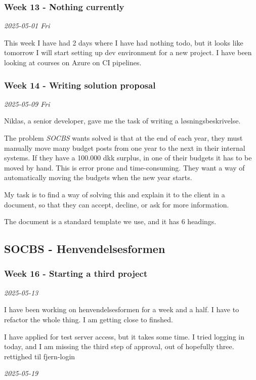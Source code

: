 \documentclass[../main.tex]{subfiles}
\begin{document}
\subsubsection{Week 13 - Nothing currently}
\noindent \textit{2025-05-01 Fri}
\smallskip

This week I have had 2 days where I have had nothing todo, but it looks like tomorrow I will start setting up dev environment for a new project. I have been looking at courses on Azure on CI pipelines.

\subsubsection{Week 14 - Writing solution proposal}

\noindent \textit{2025-05-09 Fri}
\smallskip

Niklas, a senior developer, gave me the task of writing a løsningsbeskrivelse.

The problem \textit{SOCBS} wants solved is that at the end of each year, they must manually move many budget posts from one year to the next in their internal systems. If they have a 100.000 dkk surplus, in one of their budgets it has to be moved by hand.
This is error prone and time-consuming. They want a way of automatically moving the budgets when the new year starts.

My task is to find a way of solving this and explain it to the client in a document, so that they can accept, decline, or ask for more information.

The document is a standard template we use, and it has 6 headings.

\subsection{SOCBS - Henvendelsesformen}
\subsubsection{Week 16 - Starting a third project}
\noindent \textit{2025-05-13}
\smallskip

I have been working on henvendelsesformen for a week and a half. I have to refactor the whole thing. I am getting close to finshed.

I have applied for test server access, but it takes some time. I tried logging in today, and I am missing the third step of approval, out of hopefully three. rettighed til fjern-login

\bigskip
\noindent \textit{2025-05-19}
\smallskip
\end{document}
